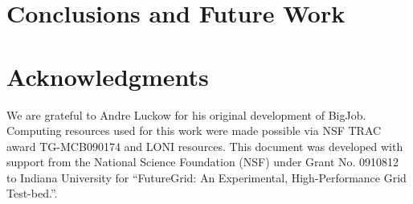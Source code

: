 \documentclass{sig-alternate}
\begin{document}
\section{Conclusions and Future Work}


\section{Acknowledgments}
We are grateful to Andre Luckow for his original development of
BigJob.  Computing resources used for this work were made possible via
NSF TRAC award TG-MCB090174 and LONI resources.  This document was
developed with support from the National Science Foundation (NSF)
under Grant No.  0910812 to Indiana University for ``FutureGrid: An
Experimental, High-Performance Grid Test-bed.''.



\end{document}
